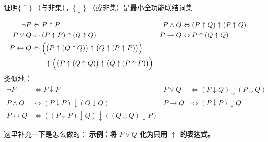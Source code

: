 \documentclass[lang=cn,11pt]{elegantbook}
\begin{document}
\begin{example}
    证明$\{\uparrow\}$ （与非集），$\{\downarrow\}$ （或非集）是最小全功能联结词集
\end{example}
\begin{solution}
\begin{align*}
    \neg P &\Leftrightarrow P \uparrow P &
    P \land Q &\Leftrightarrow (P \uparrow Q) \uparrow (P \uparrow Q) \\
    P \lor Q &\Leftrightarrow (P \uparrow P) \uparrow (Q \uparrow Q) &
    P \rightarrow Q &\Leftrightarrow P \uparrow (Q \uparrow Q) \\
    P \leftrightarrow Q &\Leftrightarrow \Bigl(\bigl(P \uparrow (Q \uparrow Q)\bigr) \uparrow \bigl(Q \uparrow (P \uparrow P)\bigr)\Bigr) \\
    &\qquad \uparrow \Bigl(\bigl(P \uparrow (Q \uparrow Q)\bigr) \uparrow \bigl(Q \uparrow (P \uparrow P)\bigr)\Bigr)
\end{align*}
类似地：
\begin{align*}
    \neg P &\Leftrightarrow P \downarrow P &
    P \lor Q &\Leftrightarrow (P \downarrow Q) \downarrow (P \downarrow Q) \\
    P \land Q &\Leftrightarrow (P \downarrow P) \downarrow (Q \downarrow Q) &
    P \rightarrow Q &\Leftrightarrow (P \downarrow P) \downarrow Q \\
    P \leftrightarrow Q &\Leftrightarrow ((P \downarrow P) \downarrow Q) \downarrow ((Q \downarrow Q) \downarrow P)
\end{align*}
\end{solution}
这里补充一下是怎么做的：
\textbf{示例：将 $P \lor Q$ 化为只用 $\uparrow$ 的表达式。}
\end{document}
